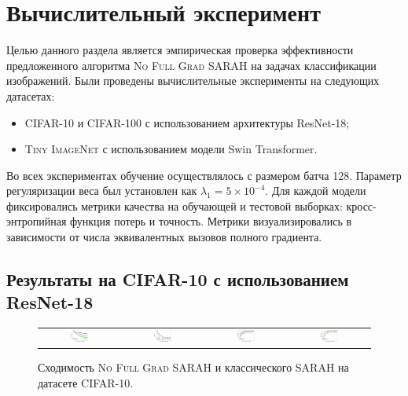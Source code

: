 \section{Вычислительный эксперимент} \label{section:experiments}

Целью данного раздела является эмпирическая проверка эффективности предложенного алгоритма \textsc{No Full Grad SARAH} на задачах классификации изображений. Были проведены вычислительные эксперименты на следующих датасетах:
\begin{itemize}
    \item \textsc{CIFAR-10} и \textsc{CIFAR-100} с использованием архитектуры ResNet-18;
    \item \textsc{Tiny ImageNet} с использованием модели Swin Transformer.
\end{itemize}

Во всех экспериментах обучение осуществлялось  с размером батча 128. Параметр регуляризации веса был установлен как $\lambda_1 = 5 \times 10^{-4}$. Для каждой модели фиксировались метрики качества на обучающей и тестовой выборках: кросс-энтропийная функция потерь и точность. Метрики визуализировались в зависимости от числа эквивалентных вызовов полного градиента.

\subsection{Результаты на \textsc{CIFAR-10} с использованием ResNet-18}

\begin{figure}[H]
\centering
\begin{tabular}{cccc}
\includegraphics[width=0.235\textwidth]{plots/sarah_10-train-loss_compressed.pdf} &
\includegraphics[width=0.24\textwidth]{plots/sarah_10-test-loss_compressed.pdf} &
\includegraphics[width=0.23\textwidth]{plots/sarah_10-train-accuracy_compressed.pdf} &
\includegraphics[width=0.23\textwidth]{plots/sarah_10-test-accuracy_compressed.pdf}
\end{tabular}
\caption{Сходимость \textsc{No Full Grad SARAH} и классического \textsc{SARAH} на датасете CIFAR-10.}
\label{fig:sarah_10}
\end{figure}

